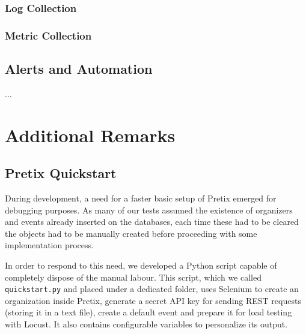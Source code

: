 \documentclass[12pt]{article}
\begin{document}

\subsubsection{Log Collection}
\subsubsection{Metric Collection}

\subsection{Alerts and Automation} \label{management.automation} %


...

\newpage
\section{Additional Remarks} \label{remarks} %

\subsection{Pretix Quickstart} \label{remarks.quickstart} %


During development, a need for a faster basic setup of Pretix emerged for debugging purposes.
As many of our tests assumed the existence of organizers and events already inserted on the databases, each time these had to be cleared the objects had to be
manually created before proceeding with some implementation process.

In order to respond to this need, we developed a Python script capable of completely dispose of the manual labour.
This script, which we called \texttt{quickstart.py} and placed under a dedicated folder, uses Selenium \cite{selenium} to create an organization inside Pretix,
generate a secret API key for sending REST requests (storing it in a text file), create a default event and prepare it for load testing with Locust.
It also contains configurable variables to personalize its output.
\end{document}
